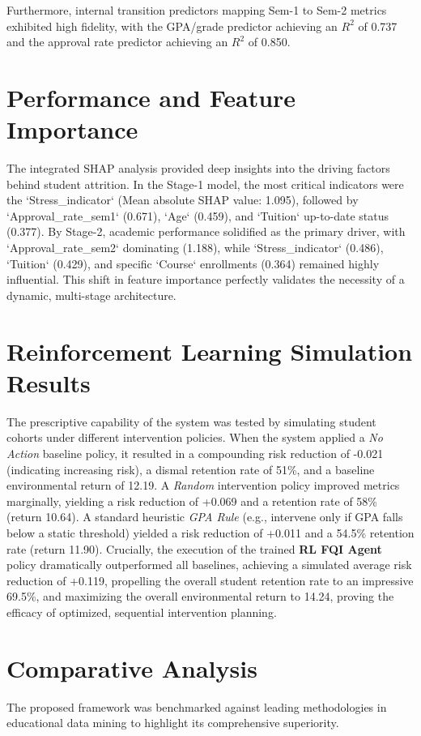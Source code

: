\documentclass[12pt,a4paper]{report}
\begin{document}
Furthermore, internal transition predictors mapping Sem-1 to Sem-2 metrics exhibited high fidelity, with the GPA/grade predictor achieving an $R^2$ of 0.737 and the approval rate predictor achieving an $R^2$ of 0.850.

\section{Performance and Feature Importance}
The integrated SHAP analysis provided deep insights into the driving factors behind student attrition. In the Stage-1 model, the most critical indicators were the `Stress_indicator` (Mean absolute SHAP value: 1.095), followed by `Approval_rate_sem1` (0.671), `Age` (0.459), and `Tuition` up-to-date status (0.377). By Stage-2, academic performance solidified as the primary driver, with `Approval_rate_sem2` dominating (1.188), while `Stress_indicator` (0.486), `Tuition` (0.429), and specific `Course` enrollments (0.364) remained highly influential. This shift in feature importance perfectly validates the necessity of a dynamic, multi-stage architecture.

\section{Reinforcement Learning Simulation Results}
The prescriptive capability of the system was tested by simulating student cohorts under different intervention policies. 
When the system applied a \textit{No Action} baseline policy, it resulted in a compounding risk reduction of -0.021 (indicating increasing risk), a dismal retention rate of 51\%, and a baseline environmental return of 12.19. A \textit{Random} intervention policy improved metrics marginally, yielding a risk reduction of +0.069 and a retention rate of 58\% (return 10.64). A standard heuristic \textit{GPA Rule} (e.g., intervene only if GPA falls below a static threshold) yielded a risk reduction of +0.011 and a 54.5\% retention rate (return 11.90). 
Crucially, the execution of the trained \textbf{RL FQI Agent} policy dramatically outperformed all baselines, achieving a simulated average risk reduction of +0.119, propelling the overall student retention rate to an impressive 69.5\%, and maximizing the overall environmental return to 14.24, proving the efficacy of optimized, sequential intervention planning.

\section{Comparative Analysis}
The proposed framework was benchmarked against leading methodologies in educational data mining to highlight its comprehensive superiority.
\end{document}
